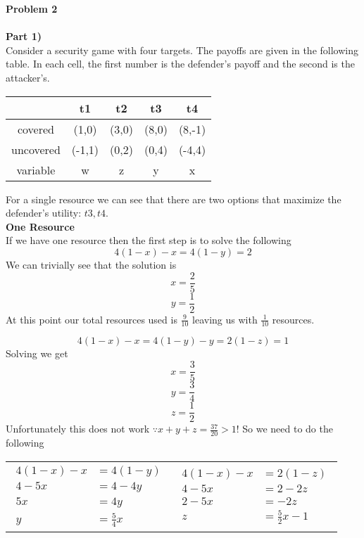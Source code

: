 \documentclass[12pt,letter]{article}
\newcommand{\problem}[1]{\vspace{3mm}\Large\textbf{{Problem {#1}\vspace{3mm}}}\normalsize\\}
\newcommand{\ppart}[1]{\vspace{2mm}\large\textbf{\\Part {#1})\vspace{2mm}}\normalsize\\}
\begin{document}
\problem{2}
\ppart{1}
Consider a security game with four targets. The payoffs are given in the following 
table. In each cell, the first number is the defender's payoff and the second is
the attacker's.
\begin{figure*}[h]
\centering
\begin{tabular}{|c|c|c|c|c|}
    \hline
    & t1 & t2 & t3 & t4\\
    \hline
    covered & (1,0) & (3,0) & (8,0) & (8,-1)\\
    \hline
    uncovered & (-1,1) & (0,2) & (0,4) & (-4,4)\\
    \hline
    variable  & w & z & y & x\\
    \hline
\end{tabular}
\end{figure*}

For a single resource we can see that there are two options that maximize 
the defender's utility: ${t3,t4}$. 
\\
\large\textbf{One Resource}\normalsize
\\

If we have one resource then the first step is to solve the following
\[
    4(1-x) - x = 4(1-y) = 2
\]
We can trivially see that the solution is
\[
    x = \frac25
\]\[
    y = \frac12
\]
At this point our total resources used is $\frac{9}{10}$ leaving us with $\frac{1}{10}$ 
resources.

\[
    4(1-x) -x = 4(1-y) - y = 2(1-z) = 1
\]
Solving we get
\[
    x = \frac35
\]\[
    y = \frac34
\]\[
    z = \frac12
\]
Unfortunately this does not work $\because x+y+z=\frac{37}{20}>1$! So we need to do the following
\begin{figure*}[h]
\centering
\begin{tabular}{p{}p{}}
    {\begin{align*}
    4(1-x) - x &= 4(1-y) \\
        4 - 5x &= 4 - 4y\\
        5x &= 4y\\
        y &= \frac54x
    \end{align*}}
    & 
    {\begin{align*}
        4(1-x) -x &= 2(1-z)\\
        4 - 5x &= 2 - 2z \\
        2 - 5x &= -2z\\
        z &= \frac52x - 1
    \end{align*}}
\end{tabular}
\end{figure*}
\end{document}
